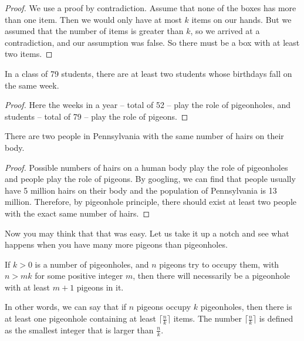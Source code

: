 \begin{proof}
We use a proof by contradiction.
Assume that none of the boxes has more than one item. Then we would only have at most $k$ items on our hands. But we assumed that the number of items is greater than $k$, so we arrived at a contradiction, and our assumption was false. So there must be a box with at least two items.
\end{proof}


\begin{example}
In a class of 79 students, there are at least two students whose birthdays fall on the same week.
\end{example}

\begin{proof}
Here the weeks in a year -- total of 52 -- play the role of pigeonholes, and students -- total of 79 -- play the role of pigeons.
\end{proof}

\begin{example}
There are two people in Pennsylvania with the same number of hairs on their body.
\end{example}

\begin{proof}
Possible numbers of hairs on a human body play the role of pigeonholes and people play the role of pigeons. By googling, we can find that people usually have 5 million hairs on their body and the population of Pennsylvania is 13 million. Therefore, by pigeonhole principle, there should exist at least two people with the exact same number of hairs.
\end{proof}

Now you may think that that was easy. Let us take it up a notch and see what happens when you have many more pigeons than pigeonholes.

\begin{theorem}
\label{thrm:gen_pigeonhole}
If $k>0$ is a number of pigeonholes, and $n$ pigeons try to occupy them, with $n>mk$ for some positive integer $m$, then there will necessarily be a pigeonhole with at least $m+1$ pigeons in it.

In other words, we can say that if $n$ pigeons occupy $k$ pigeonholes, then there is at least one pigeonhole containing at least $\lceil \frac{n}{k} \rceil$ items. The number $\lceil \frac{n}{k} \rceil$ is defined as the smallest integer that is larger than $\frac{n}{k}$.
\end{theorem}

